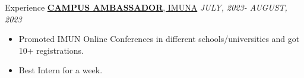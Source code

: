 \documentclass{resume} %
\begin{document}
\begin{rSection}{Experience}
\href{https://1drv.ms/i/s!AqmF3ryI8xyngdlvi5puoHlWRF5NTQ?e=hyfCRH}{{\bf CAMPUS AMBASSADOR}{, IMUNA}} \hfill {\em JULY, 2023- AUGUST, 2023}\vspace{-3pt}
\begin{itemize}\setlength{\itemsep}{-6pt}
    \item Promoted IMUN Online Conferences in different schools/universities and got 10+ registrations.
    \item Best Intern for a week.
\end{itemize}
\end{rSection}
\end{document}
